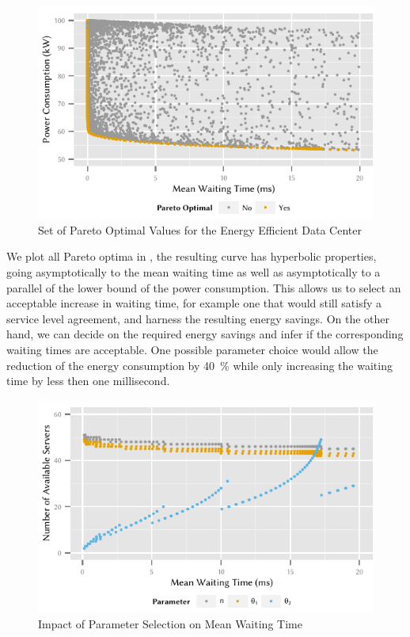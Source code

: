 \begin{figure}
  \centering
  \includegraphics{cloud/data_centers/performance_evaluation/figures/energy_vs_waiting_pareto}
  \caption{Set of Pareto Optimal Values for the Energy Efficient Data Center}
  \label{fig:cloud:data_centers:performance_evaluation:energy_vs_waiting_pareto}
\end{figure}

We plot all Pareto optima in , the resulting curve has hyperbolic properties, going asymptotically to the mean waiting time as well as asymptotically to a parallel of the lower bound of the power consumption.
This allows us to select an acceptable increase in waiting time, for example one that would still satisfy a service level agreement, and harness the resulting energy savings.
On the other hand, we can decide on the required energy savings and infer if the corresponding waiting times are acceptable.
One possible parameter choice would allow the reduction of the energy consumption by \SI{40}{\percent} while only increasing the waiting time by less then one millisecond.

\begin{figure}
  \centering
  \includegraphics{cloud/data_centers/performance_evaluation/figures/sorted_results}
  \caption{Impact of Parameter Selection on Mean Waiting Time}
  \label{fig:cloud:data_centers:performance_evaluation:sorted_results}
\end{figure}

